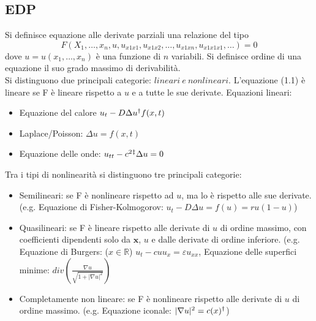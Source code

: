 \documentclass[a4paper,12pt, draft]{article}
\theoremstyle{break}
\let\epsilon\varepsilon
\numberwithin{equation}{section}
\begin{document}
\subsection{EDP}
Si definisce equazione alle derivate parziali una relazione del tipo
\begin{equation}
F(X_1,\ldots, x_n, u, u_{x1x1}, u_{x1x2}, \ldots, u_{x1xn}, u_{x1x1x1},\ldots) = 0
\end{equation} dove $u = u(x_1,\ldots,x_n)$ è una funzione di $n$ variabili. Si definisce ordine di una equazione il suo grado massimo di derivabilità. \\
Si distinguono due principali categorie: $lineari\ e\ nonlineari$.  
L'equazione (1.1) è lineare se F è lineare rispetto a $u$ e a tutte le sue derivate.
Equazioni lineari: 
\begin{itemize}
\item Equazione del calore $u_t- D\Delta u\symbolfootnotemark[2] = f(x,t)$ \item Laplace/Poisson: $\Delta u = f(x,t)$ 
\item Equazione delle onde: $u_{tt} - c^2 \symbolfootnotemark[3] * \Delta u = 0$
\end{itemize}
Tra i tipi di nonlinearità si distinguono tre principali categorie:
\begin{itemize}
\item Semilineari: se F è nonlineare rispetto ad $u$, ma lo è rispetto alle sue derivate. (e.g. Equazione di Fisher-Kolmogorov: $u_t - D\Delta u = f(u) = ru(1-u)$)
\item Quasilineari: se F è lineare rispetto alle derivate di $u$ di ordine massimo, con coefficienti dipendenti solo da $\bm{x}$, $u$ e dalle derivate di ordine inferiore. (e.g. Equazione di Burgers: ($x \in \mathbb{R}$) $u_t - cuu_x = \epsilon u_{xx}$, Equazione delle superfici minime: $div\left(\frac{\nabla u}{\sqrt{1+|\nabla u|^2}}\right)$
\item Completamente non lineare: se F è nonlineare rispetto alle derivate di $u$ di ordine massimo. (e.g. Equazione iconale: $|\nabla u| ^2 = c(x) \symbolfootnotemark[2] *$)
\end{itemize}
\end{document}
